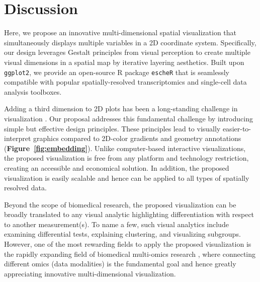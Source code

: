 \documentclass[10pt,twocolumn]{article}
\begin{document}
\section{Discussion}
Here, we propose an innovative multi-dimensional spatial visualization that simultaneously displays multiple variables in a 2D coordinate system. Specifically, our design leverages Gestalt principles from visual perception to create multiple visual dimensions in a spatial map by iterative layering aesthetics. Built upon \texttt{ggplot2}, we provide an open-source R package \texttt{escheR} that is seamlessly compatible with popular spatially-resolved transcriptomics and single-cell data analysis toolboxes. 

Adding a third dimension to 2D plots has been a long-standing challenge in visualization \cite{odonoghue_2010}. Our proposal addresses this fundamental challenge by introducing simple but effective design principles. These principles lead to visually easier-to-interpret graphics compared to 2D-color gradients and geometry annotations (\textbf{Figure~\ref{fig:embedding}}). Unlike computer-based interactive visualizations, the proposed visualization is free from any platform and technology restriction, creating an accessible and economical solution. In addition, the proposed visualization is easily scalable and hence can be applied to all types of spatially resolved data. 

Beyond the scope of biomedical research, the proposed visualization can be broadly translated to any visual analytic highlighting differentiation with respect to another measurement(s). To name a few, such visual analytics include examining differential tests,  explaining clustering, and visualizing subgroups. However, one of the most rewarding fields to apply the proposed visualization is the rapidly expanding field of biomedical multi-omics research \cite{hasin_2017}, where connecting different omics (data modalities) is the fundamental goal and hence greatly appreciating innovative multi-dimensional visualization. 
\end{document}
